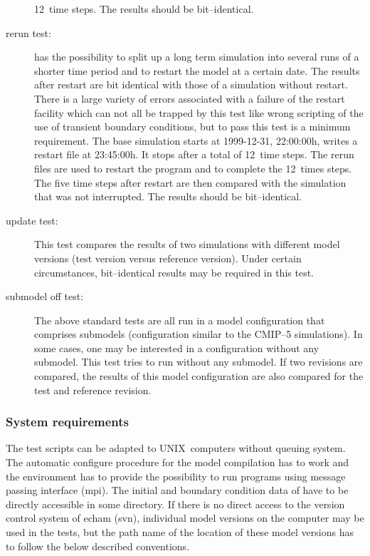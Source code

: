\begin{description}
  12~time steps. The results should be bit--identical.
\item[rerun test:] \echam{} has the possibility to split up a long term
  simulation into several runs of a shorter time period and to restart
  the model at a certain date. The results after restart are bit
  identical with those of a simulation without restart. There is a
  large variety of errors associated with a failure of the restart
  facility which can not all be trapped by this test like wrong
  scripting of the use of transient boundary conditions, but to pass this
  test is a minimum requirement. The base simulation starts at
  1999-12-31, 22:00:00h, writes a
  restart file at 23:45:00h. It stops after a total of 12~time
  steps. The rerun files are used to restart the program and 
  to complete the 12~times steps. The five time steps after restart
  are then compared with the simulation that was not interrupted. The
  results should be bit--identical.  
\item[update test:] This test compares the results of two simulations
  with different model versions (test version versus reference
  version). Under certain circumstances, 
  bit--identical results may be required in this test.
\item[submodel off test:] The above standard tests are all run in a
  model configuration that comprises submodels (configuration similar
  to the CMIP--5 simulations). In some cases, one may be interested in
  a configuration without any submodel. This test tries to run \echam{}
  without any submodel. If two revisions are compared, the
  results of this model configuration are also compared for the test
  and reference 
  revision.
\end{description}

\subsubsection{System requirements}

The \echam{} test scripts can be adapted to UNIX~computers without queuing
system. The automatic configure procedure for the model compilation
has to work and the environment has to provide the possibility to run
programs using message passing interface (mpi). The initial and
boundary condition data of \echam{} have to be 
directly accessible in some directory. If there is no direct access to
the version control system of echam (svn), individual model versions
on the computer may be used in the 
tests, but the path name of the location of these model versions has to
follow the below described conventions.

